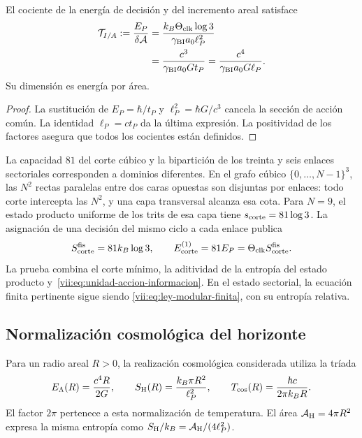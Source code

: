\begin{proposition}
\label{vii:prop:tension-informacion-area}
El cociente de la energía de decisión y del incremento areal satisface
\begin{equation}
 \begin{aligned}
 \mathcal T_{I/A}:=\frac{E_P}{\delta\mathcal A}
 &=\frac{k_B\Theta_{\rm clk}\log3}{\gamma_{\rm BI}a_0\ell_P^2}\\
 &=\frac{c^3}{\gamma_{\rm BI}a_0G t_P}
  =\frac{c^4}{\gamma_{\rm BI}a_0G\ell_P}.
 \end{aligned}
 \label{vii:eq:tension-informacion-area}
\end{equation}
Su dimensión es energía por área.
\end{proposition}
\begin{proof}
La sustitución de \(E_P=\hbar/t_P\) y
\(\ell_P^2=\hbar G/c^3\) cancela la sección de acción común.
La identidad \(\ell_P=ct_P\) da la última expresión. La positividad
de los factores asegura que todos los cocientes están definidos.
\end{proof}

La capacidad \(81\) del corte cúbico y la bipartición de los treinta y
seis enlaces sectoriales corresponden a dominios diferentes. En el
grafo cúbico \(\{0,\ldots,N-1\}^3\), las \(N^2\) rectas
paralelas entre dos caras opuestas son disjuntas por enlaces: todo corte
intercepta las \(N^2\), y una capa transversal alcanza esa cota.
Para \(N=9\), el estado producto uniforme de los trits de esa capa
tiene \(s_{\rm corte}=81\log3\). La asignación de una decisión del
mismo ciclo a cada enlace publica
\begin{equation}
 S_{\rm corte}^{\rm fis}=81k_B\log3,\qquad
 E_{\rm corte}^{(1)}=81E_P
                  =\Theta_{\rm clk}S_{\rm corte}^{\rm fis}.
 \label{vii:eq:corte-energia-informacion}
\end{equation}
La prueba combina el corte mínimo, la aditividad de la entropía del
estado producto y~\eqref{vii:eq:unidad-accion-informacion}. En el estado
sectorial, la ecuación finita pertinente sigue siendo
\eqref{vii:eq:ley-modular-finita}, con su entropía relativa.

\subsection{Normalización cosmológica del horizonte}
\label{vii:subsec:balance-horizonte}

Para un radio areal \(R>0\), la realización cosmológica considerada
utiliza la tríada
\begin{equation}
 E_\Lambda(R)=\frac{c^4R}{2G},\qquad
 S_{\rm H}(R)=\frac{k_B\pi R^2}{\ell_P^2},\qquad
 T_{\rm cos}(R)=\frac{\hbar c}{2\pi k_BR}.
 \label{vii:eq:horizonte-cosmologico}
\end{equation}
El factor \(2\pi\) pertenece a esta normalización de temperatura.
El área \(\mathcal A_{\rm H}=4\pi R^2\) expresa la misma entropía
como \(S_{\rm H}/k_B=\mathcal A_{\rm H}/(4\ell_P^2)\).

